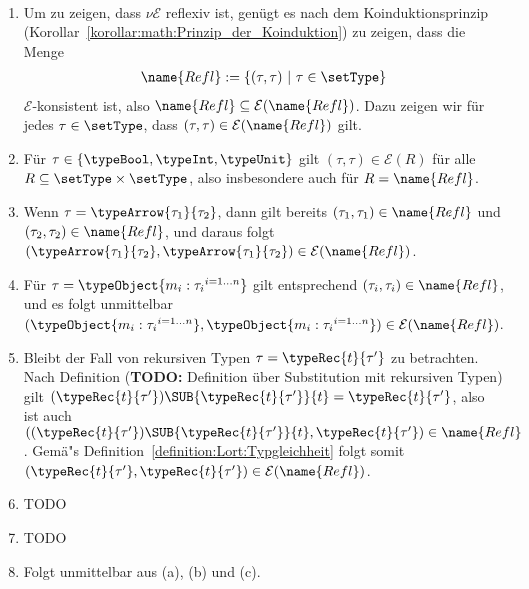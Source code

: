 \begin{beweis} \
  \begin{enumerate}
    \item Um zu zeigen, dass $\nu \mathcal{E}$ reflexiv ist, gen\"ugt es nach dem Koinduktionsprinzip
          (Korollar~\ref{korollar:math:Prinzip_der_Koinduktion}) zu zeigen, dass die Menge
          \[\begin{array}{rcl}
            \name{Refl} := \{(\tau,\tau)\ |\ \tau\in\setType\}
          \end{array}\]
          $\mathcal{E}$-konsistent ist, also $\name{Refl} \subseteq \mathcal{E}(\name{Refl})$. Dazu zeigen wir f\"ur
          jedes $\tau\in\setType$, dass $(\tau,\tau)\in\mathcal{E}(\name{Refl})$ gilt.
          \PROOFCASEbeg
            \item F\"ur $\tau \in \{\typeBool,\typeInt,\typeUnit\}$ gilt $(\tau,\tau)\in\mathcal{E}(R)$
                  f\"ur alle $R \subseteq \setType\times\setType$, also insbesondere auch f\"ur
                  $R = \name{Refl}$.

            \item Wenn $\tau = \typeArrow{\tau_1}{\tau_2}$, dann gilt bereits $(\tau_1,\tau_1)\in \name{Refl}$
                  und $(\tau_2,\tau_2)\in \name{Refl}$, und daraus folgt
                  $(\typeArrow{\tau_1}{\tau_2},\typeArrow{\tau_1}{\tau_2})\in\mathcal{E}(\name{Refl})$.

            \item F\"ur $\tau = \typeObject{{m_i:\tau_i}^{i=1 \ldots n}}$ gilt entsprechend
                  $(\tau_i,\tau_i)\in \name{Refl}$, und es folgt unmittelbar
                  $(\typeObject{{m_i:\tau_i}^{i=1 \ldots n}},\typeObject{{m_i:\tau_i}^{i=1 \ldots n}})
                   \in \mathcal{E}(\name{Refl})$.

            \item Bleibt der Fall von rekursiven Typen $\tau = \typeRec{t}{\tau'}$ zu betrachten.
                  Nach Definition ({\bf TODO:} Definition \"uber Substitution mit rekursiven Typen)
                  gilt $(\typeRec{t}{\tau'})\SUB{\typeRec{t}{\tau'}}{t} = \typeRec{t}{\tau'}$, also
                  ist auch $((\typeRec{t}{\tau'})\SUB{\typeRec{t}{\tau'}}{t}, \typeRec{t}{\tau'})\in \name{Refl}$.
                  Gem\"a"s Definition~\ref{definition:Lort:Typgleichheit} folgt somit
                  $(\typeRec{t}{\tau'},\typeRec{t}{\tau'})\in\mathcal{E}(\name{Refl})$.
          \PROOFCASEend

    \item TODO

    \item TODO

    \item Folgt unmittelbar aus (a), (b) und (c).
  \end{enumerate}
\end{beweis}

